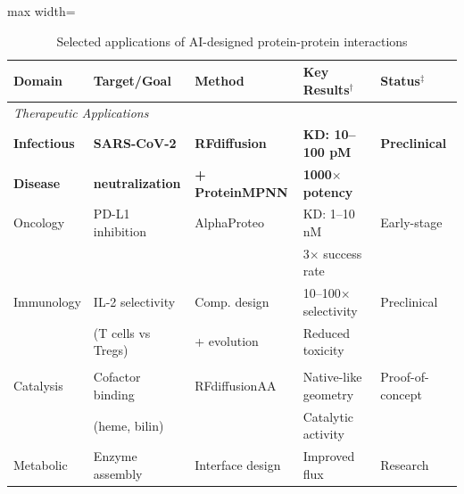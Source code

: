 %
%
%
%

\begin{table}[h]
\centering
\caption{Selected applications of AI-designed protein-protein interactions}
\label{tab:applications}
\small
\begin{adjustbox}{max width=\textwidth}
\begin{tabular}{@{}p{2cm}p{2.5cm}p{2cm}p{3cm}p{2cm}@{}}
\toprule
\textbf{Domain} & \textbf{Target/Goal} & \textbf{Method} & \textbf{Key Results}$^\dagger$ & \textbf{Status}$^\ddagger$ \\
\midrule
\multicolumn{5}{l}{\textit{Therapeutic Applications}} \\
\addlinespace
\textbf{Infectious} & \textbf{SARS-CoV-2} & \textbf{RFdiffusion} & \textbf{KD: 10--100 pM} & \textbf{Preclinical} \\
\textbf{Disease} & \textbf{neutralization} & \textbf{+ ProteinMPNN} & \textbf{1000$\times$ potency} & \\
\addlinespace
Oncology & PD-L1 inhibition & AlphaProteo & KD: 1--10 nM & Early-stage \\
& & & 3$\times$ success rate & \\
\addlinespace
Immunology & IL-2 selectivity & Comp. design & 10--100$\times$ selectivity & Preclinical \\
& (T cells vs Tregs) & + evolution & Reduced toxicity & \\
\addlinespace
\multicolumn{5}{l}{\textit{Industrial Applications}} \\
\addlinespace
Catalysis & Cofactor binding & RFdiffusionAA & Native-like geometry & Proof-of-concept \\
& (heme, bilin) & & Catalytic activity & \\
\addlinespace
Metabolic & Enzyme assembly & Interface design & Improved flux & Research \\

\end{tabular}
\end{adjustbox}
\end{table}
